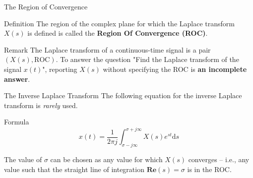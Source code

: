 \documentclass[aspectratio=169]{beamer}
\begin{document}
\begin{frame}{The Region of Convergence}
	\onslide<1->\begin{block}{Definition}
		The region of the complex plane for which the Laplace transform $ X(s) $ is defined is called the \textbf{Region Of Convergence (ROC)}.
	\end{block}

	\begin{block}{Remark}
		The Laplace transform of a continuous-time signal is a pair $ \left(X(s) , \mathrm{ROC}\right) $. To answer the question "Find the Laplace transform of the signal $ x(t) $", reporting $ X(s) $ without specifying the ROC is \textbf{an incomplete answer}.
	\end{block}
\end{frame}

\begin{frame}{The Inverse Laplace Transform}
	The following equation for the inverse Laplace transform is \textit{rarely} used.
	\begin{block}{Formula}
		\[x(t) = \frac{1}{2\pi j}\int_{\sigma-j\infty}^{\sigma+j\infty}X(s)e^{st}\mathrm{d}s\]
	\end{block}
	The value of $ \sigma $ can be chosen as any value for which $ X(s) $ converges -- i.e., any value such that the straight line of integration $ \mathbf{Re}(s) = \sigma $
	is in the ROC.
\end{frame}
\end{document}
